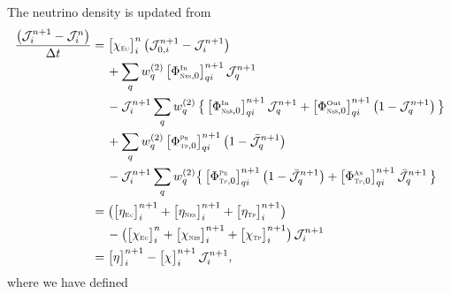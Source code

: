 \documentclass[12pt]{article}
\newcommand{\EC}{\mbox{\tiny{\sc Ec}}}
\newcommand{\NES}{\mbox{\tiny{\sc Nes}}} %
\newcommand{\PROD}{\mbox{\tiny{\sc Pr}}}
\newcommand{\ANN}{\mbox{\tiny{\sc An}}}
\newcommand{\TP}{\mbox{\tiny{\sc Tp}}}      %
\begin{document}
The neutrino density is updated from
\begin{align}
  \f{\big(\mathcal{J}_{i}^{n+1}-\mathcal{J}_{i}^{n}\big)}{\dt}
  &=\big[\chi_{\EC}\big]_{i}^{n}\,\big(\mathcal{J}_{0,i}^{n+1}-\mathcal{J}_{i}^{n+1}\big) \nonumber \\
  &\hspace{12pt}
  +\sum_{q}w_{q}^{(2)}\,\big[\Phi_{\NES,0}^{\In}\big]_{qi}^{n+1}\,\mathcal{J}_{q}^{n+1} \nonumber \\
  &\hspace{12pt}
  -\mathcal{J}_{i}^{n+1}\sum_{q}w_{q}^{(2)}\,\big\{\,\big[\Phi_{\NES,0}^{\In}\big]_{qi}^{n+1}\,\mathcal{J}_{q}^{n+1}+\big[\Phi_{\NES,0}^{\Out}\big]_{qi}^{n+1}\,\big(1-\mathcal{J}_{q}^{n+1}\big)\,\big\} \nonumber \\
  &\hspace{12pt}
  + \sum_{q}w_{q}^{(2)}\,\big[\Phi_{\TP,0}^{\PROD}\big]_{qi}^{n+1}\,\big(1-\bar{\mathcal{J}}_{q}^{n+1}\big) \nonumber \\
  &\hspace{12pt}
  -\mathcal{J}_{i}^{n+1}\sum_{q}w_{q}^{(2)}\big\{\,\big[\Phi_{\TP,0}^{\PROD}\big]_{qi}^{n+1}\,\big(1-\bar{\mathcal{J}}_{q}^{n+1}\big)+\big[\Phi_{\TP,0}^{\ANN}\big]_{qi}^{n+1}\,\bar{\mathcal{J}}_{q}^{n+1}\,\big\} \nonumber \\
  &=\big(\big[\eta_{\EC}\big]_{i}^{n+1}+\big[\eta_{\NES}\big]_{i}^{n+1}+\big[\eta_{\TP}\big]_{i}^{n+1}\big) \nonumber \\
  &\hspace{12pt}
  -\big(\big[\chi_{\EC}\big]_{i}^{n}+\big[\chi_{\NES}\big]_{i}^{n+1}+\big[\chi_{\TP}\big]_{i}^{n+1}\big)\,\mathcal{J}_{i}^{n+1} \nonumber \\
  &=\big[\eta\big]_{i}^{n+1} - \big[\chi\big]_{i}^{n+1}\,\mathcal{J}_{i}^{n+1},
  \label{eq:neutrinoDiscrete}
\end{align}
where we have defined
\end{document}
